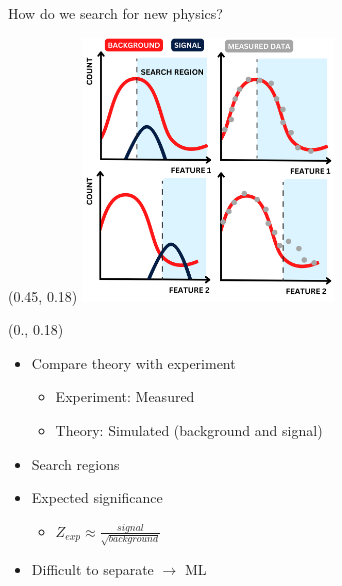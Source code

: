 \documentclass[UKenglish]{beamer}
\begin{document}
\begin{frame}{How do we search for new physics?}

    \begin{textblock}{1}(0.45, 0.18)
        \includegraphics[width = 0.5\textwidth]{figures/DataComp.png}
    \end{textblock}
    \begin{textblock}{0.45}(0., 0.18)
        \begin{itemize}
            \item Compare theory with experiment 
            \begin{itemize}
                \item Experiment: Measured
                \item Theory: Simulated (background and signal)
            \end{itemize}
            \item Search regions
            \item Expected significance
            \begin{itemize}
                \item $Z_{exp}\approx \frac{signal}{\sqrt{background}}$
            \end{itemize}
            \item Difficult to separate $\rightarrow$ ML
        \end{itemize}
    \end{textblock}
\end{frame}
\end{document}
